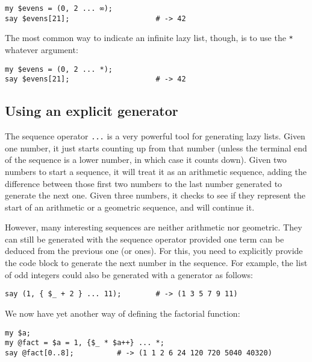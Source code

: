 \begin{verbatim}
my $evens = (0, 2 ... ∞); 
say $evens[21];                    # -> 42
\end{verbatim} 

The most common way to indicate an infinite lazy list, though, 
is to use the \verb'*' whatever argument:

\begin{verbatim}
my $evens = (0, 2 ... *); 
say $evens[21];                    # -> 42
\end{verbatim} 

\subsection{Using an explicit generator}

The sequence operator \verb'...' is a very powerful tool 
for generating lazy lists. Given one number, it just 
starts counting up from that number (unless the 
terminal end of the sequence is a lower number, 
in which case it counts down). Given two numbers 
to start a sequence, it will treat it as an arithmetic 
sequence, adding the difference between those first 
two numbers to the last number generated to generate 
the next one. Given three numbers, it checks to see 
if they represent the start of an arithmetic or a 
geometric sequence, and will continue it.

However, many interesting sequences are neither arithmetic 
nor geometric.  They can still be generated with the 
sequence operator provided one term can be deduced from 
the previous one (or ones). For this, you need to explicitly 
provide the code block to generate the next number in 
the sequence. For example, the list of odd integers 
could also be generated with a generator as follows:

\begin{verbatim}
say (1, { $_ + 2 } ... 11);        # -> (1 3 5 7 9 11)
\end{verbatim}

We now have yet another way of defining the factorial 
function:

\begin{verbatim}
my $a;
my @fact = $a = 1, {$_ * $a++} ... *;
say @fact[0..8];          # -> (1 1 2 6 24 120 720 5040 40320)
\end{verbatim}

